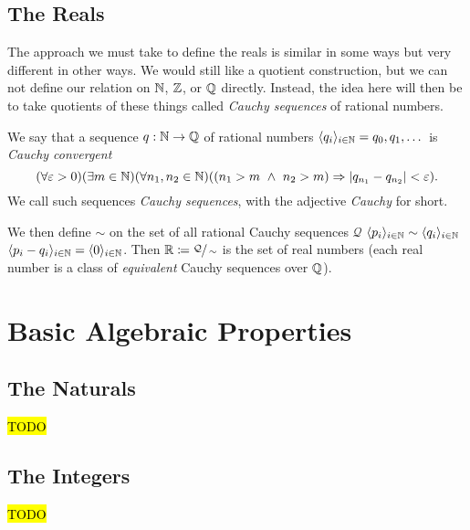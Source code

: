 \section{The Reals}
The approach we must take to define the reals is similar in some ways but very different in other ways.
We would still like a quotient construction,
but we can not define our relation on \(\mathbb{N}\), \(\mathbb{Z}\), or \(\mathbb{Q}\) directly.
Instead, the idea here will then be to take quotients of these things called
\emph{Cauchy sequences} of rational numbers.

\begin{definition}\label{def:cauchy}
    We say that a sequence \(q: \mathbb{N} \to \mathbb{Q}\)
    of rational numbers \(\langle q_i \rangle_{i \in \mathbb{N}} = q_0, q_1, \dots \)
    is \emph{Cauchy convergent} {\ifandonlyif}
    \[
        \pn*{\forall \varepsilon > 0}\pn*{\exists m \in \N}\pn*{\forall n_1, n_2 \in \N}
        \pn*{\pn*{n_1 > m~\meet~n_2 > m} \implies \abs{q_{n_1} - q_{n_2}} < \varepsilon}.
    \]
    We call such sequences \emph{Cauchy sequences}, with the adjective \emph{Cauchy} for short.
\end{definition}

We then define \(\sim\) on the set of all rational Cauchy sequences \(\mathcal{Q}\)
\(\langle p_i \rangle_{i \in \mathbb{N}} \sim \langle q_i \rangle_{i \in \mathbb{N}}\) \iffbydefn
\(\langle p_i - q_i \rangle_{i \in \mathbb{N}} = \langle 0 \rangle_{i \in \mathbb{N}}\).
Then \(\mathbb{R} \coloneqq \sfrac{\mathcal{Q}}{\sim}\) is the set of real numbers
(\ie each real number is a class of \emph{equivalent} Cauchy sequences over \(\mathbb{Q}\)).



\chapter{Basic Algebraic Properties}
\section{The Naturals}
\begin{theorem}
    \hl{TODO}
\end{theorem}

\section{The Integers}
\begin{theorem}
    \hl{TODO}
\end{theorem}

